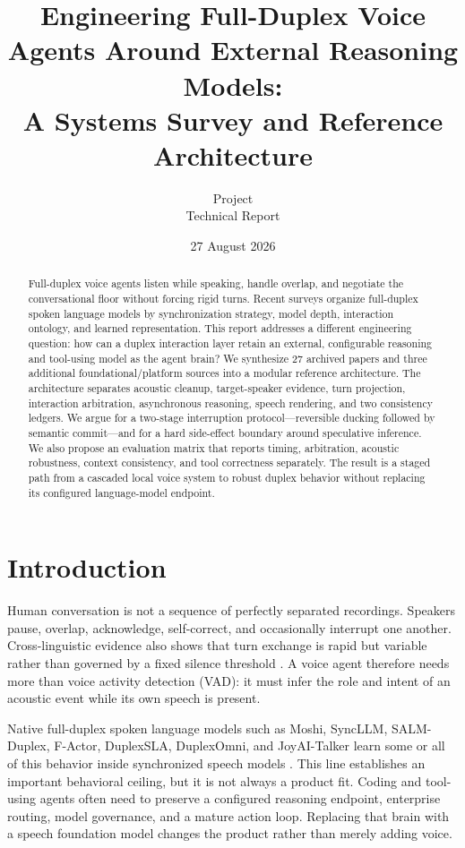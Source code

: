 \documentclass[11pt]{article}
\title{Engineering Full-Duplex Voice Agents Around External Reasoning Models:\\
A Systems Survey and Reference Architecture}
\author{\system{} Project\\Technical Report}
\date{27 August 2026}
\begin{document}
\maketitle

\begin{abstract}
Full-duplex voice agents listen while speaking, handle overlap, and negotiate
the conversational floor without forcing rigid turns. Recent surveys organize
full-duplex spoken language models by synchronization strategy, model depth,
interaction ontology, and learned representation. This report addresses a
different engineering question: how can a duplex interaction layer retain an
external, configurable reasoning and tool-using model as the agent brain? We
synthesize 27 archived papers and three additional foundational/platform
sources into a modular reference architecture. The architecture separates acoustic cleanup,
target-speaker evidence, turn projection, interaction arbitration, asynchronous
reasoning, speech rendering, and two consistency ledgers. We argue for a
two-stage interruption protocol---reversible ducking followed by semantic
commit---and for a hard side-effect boundary around speculative inference. We
also propose an evaluation matrix that reports timing, arbitration, acoustic
robustness, context consistency, and tool correctness separately. The result is
a staged path from a cascaded local voice system to robust duplex behavior
without replacing its configured language-model endpoint.
\end{abstract}

\section{Introduction}

Human conversation is not a sequence of perfectly separated recordings.
Speakers pause, overlap, acknowledge, self-correct, and occasionally interrupt
one another. Cross-linguistic evidence also shows that turn exchange is rapid
but variable rather than governed by a fixed silence threshold
\citep{stivers2009turntaking}. A voice agent therefore needs more than voice
activity detection (VAD): it must infer the role and intent of an acoustic
event while its own speech is present.

Native full-duplex spoken language models such as Moshi, SyncLLM, SALM-Duplex,
F-Actor, DuplexSLA, DuplexOmni, and JoyAI-Talker learn some or all of this
behavior inside synchronized speech models
\citep{defossez2024moshi,veluri2024syncllm,hu2025salm,zufle2026factor,zhang2026duplexsla,huang2026duplexomni,bai2026joytalker}.
This line establishes an important behavioral ceiling, but it is not always a
product fit. Coding and tool-using agents often need to preserve a configured
reasoning endpoint, enterprise routing, model governance, and a mature action
loop. Replacing that brain with a speech foundation model changes the product
rather than merely adding voice.
\end{document}
